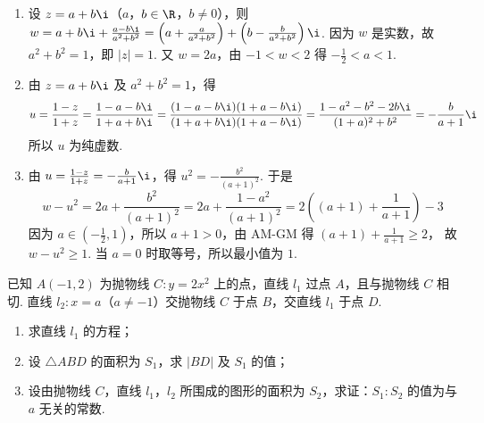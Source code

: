 \documentclass[UTF8,a4paper,oneside,11pt]{ctexbook}
\begin{document}
\begin{solution}
\begin{enumerate}
\item 设 \(z=a+b\i\)（\(a\)，\(b\in\R\)，\(b\neq0\)），则 \(w=a+b\i+\frac{a-b\i}{a^{2}+b^{2}}=\left(a+\frac{a}{a^{2}+b^{2}}\right)+\left(b-\frac{b}{a^{2}+b^{2}}\right)\i\).
因为 \(w\) 是实数，故 \(a^{2}+b^{2}=1\)，即 \(\left|z\right|=1\). 又 \(w=2a\)，由 \(-1<w<2\) 得 \(-\frac{1}{2}<a<1\).

\item 由 \(z=a+b\i\) 及 \(a^{2}+b^{2}=1\)，得
\[
u=\frac{1-z}{1+z}=\frac{1-a-b\i}{1+a+b\i}
=\frac{(1-a-b\i)(1+a-b\i)}{(1+a+b\i)(1+a-b\i)}
=\frac{1-a^{2}-b^{2}-2b\i}{(1+a)^{2}+b^{2}}
=-\frac{b}{a+1}\i
\]
所以 \(u\) 为纯虚数.

\item 由 \(u=\frac{1-z}{1+z}=-\frac{b}{a+1}\i\)，得 \(u^{2}=-\frac{b^{2}}{(a+1)^{2}}\).
于是
\[
w-u^{2}=2a+\frac{b^{2}}{(a+1)^{2}}
=2a+\frac{1-a^{2}}{(a+1)^{2}}
=2\left((a+1)+\frac{1}{a+1}\right)-3
\]
因为 \(a\in\left(-\frac{1}{2},1\right)\)，所以 \(a+1>0\)，由 AM-GM 得 \((a+1)+\frac{1}{a+1}\ge 2\)，
故 \(w-u^{2}\ge1\). 当 \(a=0\) 时取等号，所以最小值为 \(1\).
\end{enumerate}
\end{solution}



\reuseproblemnumber
\begin{problem}[B]
已知 \(A(-1,2)\) 为抛物线 \(C:y=2x^{2}\) 上的点，直线 \(l_{1}\) 过点 \(A\)，且与抛物线 \(C\) 相切. 直线 \(l_{2}:x=a\)（\(a\neq-1\)）交抛物线 \(C\) 于点 \(B\)，交直线 \(l_{1}\) 于点 \(D\).

\begin{enumerate}
\item 求直线 \(l_{1}\) 的方程；
\item 设 \(\triangle ABD\) 的面积为 \(S_{1}\)，求 \(|BD|\) 及 \(S_{1}\) 的值；
\item 设由抛物线 \(C\)，直线 \(l_{1}\)，\(l_{2}\) 所围成的图形的面积为 \(S_{2}\)，求证：\(S_{1}:S_{2}\) 的值为与 \(a\) 无关的常数.
\end{enumerate}
\end{problem}
\end{document}
